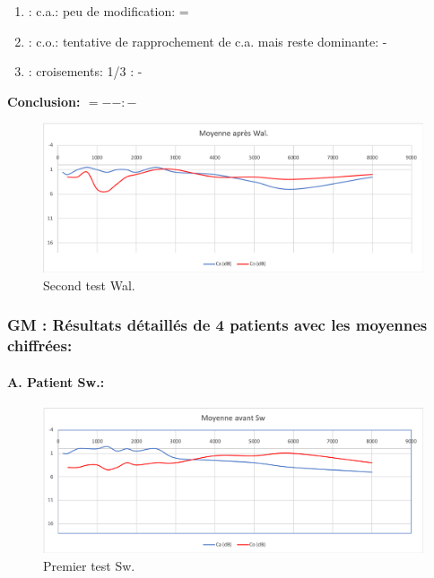 	\begin{enumerate}
 		
 		\item : c.a.: peu de modification: =
                
 		\item : c.o.: tentative de rapprochement de c.a. mais
                  reste dominante: -
 		\item : croisements: 1/3 :  -
                  
                \end{enumerate}

                \textbf{ Conclusion:  $= -  -        : -$ }

               \begin{figure}
\centering
\includegraphics[width=0.7\linewidth]{images/graphiques/wal_post.png}
\caption[Moyenne OG+OD]{Second test Wal.}
       
\label{groupecontroleimage1}
\end{figure}
                
  \subsubsection{GM : Résultats détaillés de 4 patients avec les moyennes chiffrées:}

\paragraph{ A. Patient Sw.:}



 \begin{figure}
\centering
\includegraphics[width=0.7\linewidth]{images/graphiques/sw_pre.png}
\caption[Moyenne OG+OD]{Premier test Sw.}
       
\label{groupecontroleimage1}
\end{figure}

